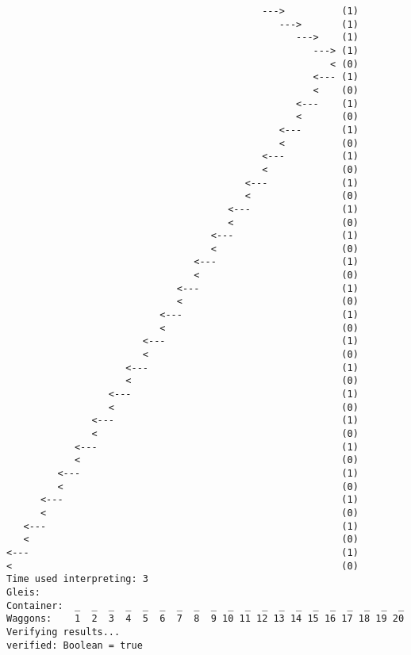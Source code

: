 \begin{lstlisting}
                                             --->          (1)
                                                --->       (1)
                                                   --->    (1)
                                                      ---> (1)
                                                         < (0)
                                                      <--- (1)
                                                      <    (0)
                                                   <---    (1)
                                                   <       (0)
                                                <---       (1)
                                                <          (0)
                                             <---          (1)
                                             <             (0)
                                          <---             (1)
                                          <                (0)
                                       <---                (1)
                                       <                   (0)
                                    <---                   (1)
                                    <                      (0)
                                 <---                      (1)
                                 <                         (0)
                              <---                         (1)
                              <                            (0)
                           <---                            (1)
                           <                               (0)
                        <---                               (1)
                        <                                  (0)
                     <---                                  (1)
                     <                                     (0)
                  <---                                     (1)
                  <                                        (0)
               <---                                        (1)
               <                                           (0)
            <---                                           (1)
            <                                              (0)
         <---                                              (1)
         <                                                 (0)
      <---                                                 (1)
      <                                                    (0)
   <---                                                    (1)
   <                                                       (0)
<---                                                       (1)
<                                                          (0)
Time used interpreting: 3
Gleis: 
Container:  _  _  _  _  _  _  _  _  _  _  _  _  _  _  _  _  _  _  _  _
Waggons:    1  2  3  4  5  6  7  8  9 10 11 12 13 14 15 16 17 18 19 20
Verifying results...
verified: Boolean = true
\end{lstlisting}
